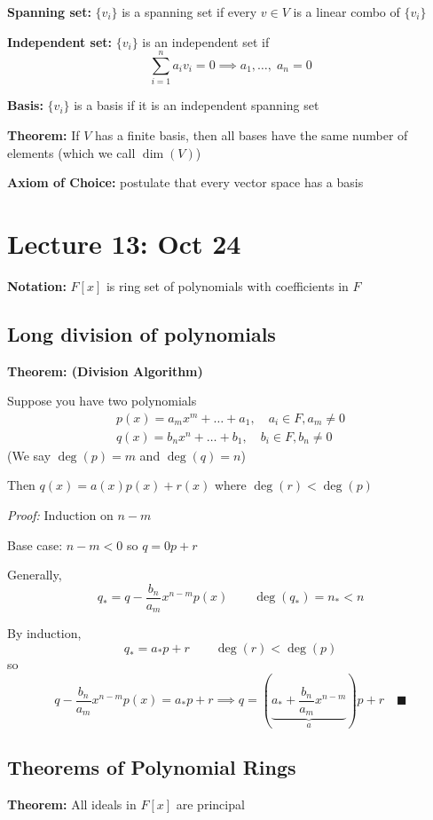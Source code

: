 \documentclass[12pt]{report}
\newcommand{\qed}{\quad \blacksquare}
\begin{document}
\textbf{Spanning set:} $\{v_i\}$ is a spanning set if every $v \in V$ is a linear combo of $\{v_i\}$

\textbf{Independent set:} $\{v_i\}$ is an independent set if 
\[\sum_{i=1}^n a_i v_i = 0 \implies a_1, \dots, \; a_n = 0\]

\textbf{Basis:} $\{v_i\}$ is a basis if it is an independent spanning set

\textbf{Theorem:} If $V$ has a finite basis, then all bases have the same number of elements (which we call $\dim(V)$)

\textbf{Axiom of Choice:} postulate that every vector space has a basis 


\section*{Lecture 13: Oct 24} 
    \textbf{Notation:} $F[x]$ is ring set of polynomials with coefficients in $F$

    \subsection*{Long division of polynomials}
    \textbf{Theorem: (Division Algorithm)} 

        Suppose you have two polynomials 
        \begin{gather*}
            p(x) = a_m x^m + \dots + a_1, \quad a_i \in F, a_m \neq 0\\
            q(x) = b_n x^n + \dots + b_1, \quad b_i \in F, b_n \neq 0
        \end{gather*}
        (We say $\deg(p) = m$ and $\deg(q) = n$)

        Then $q(x) = a(x)p(x) + r(x)$ where $\deg(r) < \deg(p)$

    \emph{Proof:} Induction on $n - m$

        Base case: $n - m < 0$ so $q = 0p + r$ 

        Generally,
        \[q_* = q - \frac{b_n}{a_m} x^{n - m} p(x) \qquad \deg(q_*) = n_* < n\]

        By induction,
        \[q_* = a_* p + r \qquad \deg(r) < \deg(p)\]
        so 
        \[q - \frac{b_n}{a_m} x^{n - m} p(x) = a_* p + r \implies q = (\underbrace{a_* + \frac{b_n}{a_m} x^{n - m}}_a)p + r \qed\]

    \subsection*{Theorems of Polynomial Rings}
    \textbf{Theorem:} All ideals in $F[x]$ are principal
\end{document}
